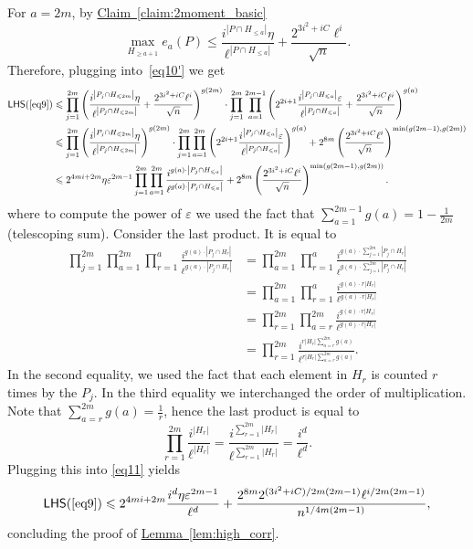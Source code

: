 \documentclass[11pt]{article}
\newcommand{\expref}[2]{\texorpdfstring{\hyperref[#2]{#1~\ref{#2}}}{#1~\ref{#2}}}
\newcommand\card[1]{\left| {#1} \right|}
\newcommand\eps{\varepsilon}
\renewcommand\geq{\geqslant}
\renewcommand\leq{\leqslant}
\begin{document}
For $a=2m$, by \expref{Claim}{claim:2moment_basic}
\[
\max_{H_{\geq a+1}} e_a(P)
\leq \frac{i^{\card{P\cap H_{\leq a}}} \eta}{\ell^{\card{P\cap H_{\leq a}}}} + \frac{2^{3i^2+iC} \ell^{i}}{\sqrt{n}}.
\]
Therefore, plugging into~\eqref{eq10'} we get
\begin{align}\label{eq11}
{\sf LHS}(\ref{eq9})
&\leq
\prod\limits_{j=1}^{2m}{
\left(\frac{i^{\card{P_j\cap H_{\leq 2m}}} \eta}{\ell^{\card{P_j\cap H_{\leq 2m}}}} + \frac{2^{3i^2+iC} \ell^{i}}{\sqrt{n}}\right)^{g(2m)}}
\cdot \prod\limits_{j=1}^{2m}{\prod\limits_{a=1}^{2m-1}{
\left(2^{2i+1} \frac{i^{\card{P_j\cap H_{\leq a}}} \eps}{\ell^{\card{P_j\cap H_{\leq a}}}} + \frac{2^{3i^2+iC} \ell^{i}}{\sqrt{n}}\right)^{g(a)}}}\nonumber\\
&\leq
\prod\limits_{j=1}^{2m}{
\left(\frac{i^{\card{P_j\cap H_{\leq 2m}}} \eta}{\ell^{\card{P_j\cap H_{\leq 2m}}}}\right)^{g(2m)}}
\cdot\prod\limits_{j=1}^{2m}{\prod\limits_{a=1}^{2m}{
\left(2^{2i+1}\frac{i^{\card{P_j\cap H_{\leq a}}} \eps}{\ell^{\card{P_j\cap H_{\leq a}}}}\right) ^{g(a)}}}
+2^{8m} \left(\frac{2^{3i^2+iC} \ell^{i}}{\sqrt{n}}\right)^{\min(g(2m-1),g(2m))}\nonumber\\
&\leq 2^{4mi+2m}\eta\eps^{2m-1}\prod\limits_{j=1}^{2m}{\prod\limits_{a=1}^{2m}{
\frac{i^{g(a)\cdot \card{P_j\cap H_{\leq a}}}}{\ell^{g(a)\cdot \card{P_j\cap H_{\leq a}}}}}}
+2^{8m} \left(\frac{2^{3i^2+iC} \ell^{i}}{\sqrt{n}}\right)^{\min(g(2m-1),g(2m))}.
\end{align}
where to compute the power of $\eps$ we used the fact that $\sum\limits_{a=1}^{2m-1}{g(a)} = 1-\frac{1}{2m}$ %
(telescoping sum).  %
Consider the last product. It is equal to
\begin{align*}
\prod\limits_{j=1}^{2m}{
\prod\limits_{a=1}^{2m}{
\prod\limits_{r=1}^{a}
\frac{i^{g(a)\cdot \card{P_j\cap H_{r}}}}{\ell^{g(a)\cdot \card{P_j\cap H_{r}}}}}}
&=
\prod\limits_{a=1}^{2m}{
\prod\limits_{r=1}^{a}
\frac{i^{g(a)\cdot \sum\limits_{j=1}^{2m}{\card{P_j\cap H_{r}}}}}{\ell^{g(a)\cdot \sum\limits_{j=1}^{2m}{\card{P_j\cap H_{r}}}}}}\\
&= \prod\limits_{a=1}^{2m}{
\prod\limits_{r=1}^{a}
\frac{i^{g(a)\cdot r\card{H_r}}}{\ell^{g(a)\cdot r\card{H_r}}}}\\
&=
\prod\limits_{r=1}^{2m}{
\prod\limits_{a=r}^{2m}
\frac{i^{g(a)\cdot r\card{H_r}}}{\ell^{g(a)\cdot r\card{H_r}}}}\\
&=
\prod\limits_{r=1}^{2m}{
\frac{i^{r\card{H_r}\sum\limits_{a=r}^{2m}{g(a)}}}{\ell^{r\card{H_r}\sum\limits_{a=r}^{2m}{g(a)}}}}.
\end{align*}
In the second equality, we used the fact that each element in $H_r$ is counted $r$ times
by the %
$P_j$.   %
In the third equality we interchanged the
order of multiplication. Note that $\sum\limits_{a=r}^{2m}{g(a)} = \frac{1}{r}$, hence the last product is equal to
\[
\prod\limits_{r=1}^{2m}{
\frac{i^{\card{H_r}}}{\ell^{\card{H_r}}}}
=\frac{i^{\sum\limits_{r=1}^{2m}{\card{H_r}}}}{\ell^{\sum\limits_{r=1}^{2m}{\card{H_r}}}}
=\frac{i^d}{\ell^{d}}.
\]
Plugging this into \eqref{eq11} yields
\[
{\sf LHS}(\ref{eq9})\leq
2^{4mi+2m}\frac{i^{d}\eta\eps^{2m-1}}{\ell^{d}}
+\frac{2^{8m}2^{(3i^2+iC)/2m(2m-1)} \ell^{i/2m(2m-1)}}{n^{1/4m(2m-1)}},
\]
concluding the proof of \expref{Lemma}{lem:high_corr}.  %
%
%
%
\end{document}
